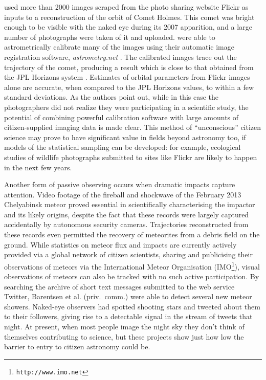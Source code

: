 \documentclass{ar2e}
\def\url#1{\texttt{#1}}
\begin{document}
\citet{Lang++2012} used more than 2000 images scraped from the photo sharing
website Flickr as inputs to a reconstruction of the orbit of Comet Holmes.
This comet was bright enough to be visible with the naked eye during its 2007
apparition, and a large number of photographs were taken of it and uploaded.
\citeauthor{Lang++2012} were able to astrometrically calibrate many of the
images using their automatic image registration software,
\textit{astrometry.net} \citep{Lang++2010}. The calibrated images trace out
the trajectory of the comet, producing a result which is close to that
obtained from the JPL Horizons system \citep{Giorgini}. Estimates of orbital
parameters from Flickr images alone are accurate, when compared to the JPL
Horizons values, to within a few standard deviations. As the authors point
out, while in this case the photographers did not realize they were
participating in a scientific study, the potential of combining powerful
calibration software with large amounts of citizen-supplied imaging data is
made clear. This method of ``unconscious'' citizen science may prove to have
significant value in fields beyond astronomy too, if models of the statistical
sampling can be developed: for example,  ecological studies of wildlife
photographs submitted to sites like Flickr are likely to happen in the next
few years. 

Another form of passive observing occurs when dramatic impacts capture
attention. Video footage of the fireball and shockwave of the February 2013
Chelyabinsk meteor \citep{13popova} proved essential in scientifically
characterising the impactor and its likely origins, despite the fact that
these records were largely captured accidentally by autonomous security
cameras.  Trajectories reconstructed from these records even permitted the
recovery of meteorites from a debris field on the ground.  While statistics
on meteor flux and impacts are currently actively provided via a global
network of citizen scientists, sharing and publicising their observations of
meteors via the International Meteor Organisation
(IMO\footnote{\url{http://www.imo.net}}), visual observations of meteors can
also be tracked with no such active participation. By searching the archive of
short text messages submitted to the web service Twitter, Barentsen et al.
(priv.\ comm.) were able to detect several new meteor showers. Naked-eye
observers had spotted shooting stars and tweeted about them to their
followers, giving rise to a detectable signal in the stream of tweets that
night.  At present, when most  people image the night sky they don't think of
themselves contributing to science, but these projects show just how low the
barrier to entry to citizen astronomy could be.
\end{document}
